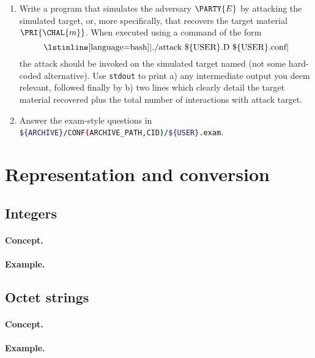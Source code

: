 \documentclass[crop={false},multi={true},tikz={true}]{standalone}
\begin{document}

\begin{enumerate}
\item Write a program that simulates the adversary $\PARTY{E}$ by attacking
      the simulated target, or, more specifically, that recovers the target 
      material $\PRI{\CHAL{m}}$.  
      When executed using a command of the form
      \[
      \mbox{\lstinline[language={bash}]|./attack \$\{USER\}.D \$\{USER\}.conf|}
      \]
      the attack should be invoked on the simulated target named (not some
      hard-coded alternative).  Use \lstinline[language={bash}]{stdout} to 
      print 
      a) any intermediate output you deem relevant, followed finally by 
      b) two lines which clearly detail the target material recovered plus
         the total number of interactions with attack target.
\item Answer the exam-style questions in 
      \lstinline[language={bash}]|${ARCHIVE}/CONF(ARCHIVE_PATH,CID)/${USER}.exam|.
\end{enumerate}


\ifstandalone
\printbibliography
\fi


\ifstandalone
\appendix 
\section{Representation and conversion}

\subsection{Integers}

\paragraph{Concept.}

\paragraph{Example.}


\subsection{Octet strings}

\paragraph{Concept.}

\paragraph{Example.}

\fi

\end{document}
